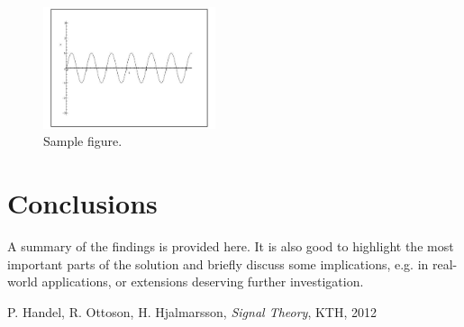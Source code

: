 \documentclass[onecolumn, 12pt]{IEEEtran}
\begin{document}
\begin{figure}[b]
\begin{center}
\includegraphics[trim=1.8cm 5.1cm 2.8cm 4.9cm, clip=true, totalheight=0.2\textheight,width=0.45\textwidth]{Sinusoid.pdf}
\end{center}
\vspace{-0.4cm}
\caption {Sample figure.}
\label{fig:Fig1}
\end{figure}

\section{Conclusions}
A summary of the findings is provided here. It is also good to highlight the most important 
parts of the solution and briefly discuss some implications, e.g. in real-world applications,
or extensions deserving further investigation.

\begin{thebibliography}{1}

P. Handel, R. Ottoson, H. Hjalmarsson, \emph{Signal Theory}, KTH, 2012

\end{thebibliography}
\end{document}
